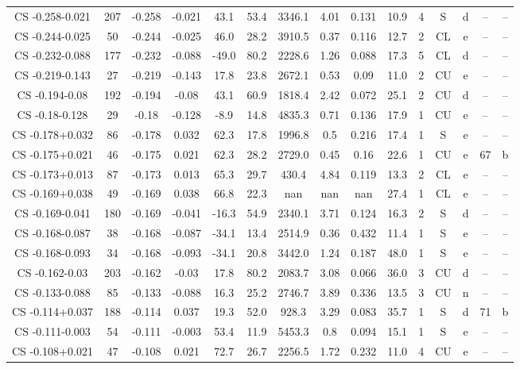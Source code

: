 \begin{table}
\begin{tabular}{ccccccccccccccc}
CS -0.258-0.021 & 207 & -0.258 & -0.021 & 43.1 & 53.4 & 3346.1 & 4.01 & 0.131 & 10.9 & 4 & S & d & -- & -- \\
CS -0.244-0.025 & 50 & -0.244 & -0.025 & 46.0 & 28.2 & 3910.5 & 0.37 & 0.116 & 12.7 & 2 & CL & e & -- & -- \\
CS -0.232-0.088 & 177 & -0.232 & -0.088 & -49.0 & 80.2 & 2228.6 & 1.26 & 0.088 & 17.3 & 5 & CL & d & -- & -- \\
CS -0.219-0.143 & 27 & -0.219 & -0.143 & 17.8 & 23.8 & 2672.1 & 0.53 & 0.09 & 11.0 & 2 & CU & e & -- & -- \\
CS -0.194-0.08 & 192 & -0.194 & -0.08 & 43.1 & 60.9 & 1818.4 & 2.42 & 0.072 & 25.1 & 2 & CU & d & -- & -- \\
CS -0.18-0.128 & 29 & -0.18 & -0.128 & -8.9 & 14.8 & 4835.3 & 0.71 & 0.136 & 17.9 & 1 & CU & e & -- & -- \\
CS -0.178+0.032 & 86 & -0.178 & 0.032 & 62.3 & 17.8 & 1996.8 & 0.5 & 0.216 & 17.4 & 1 & S & e & -- & -- \\
CS -0.175+0.021 & 46 & -0.175 & 0.021 & 62.3 & 28.2 & 2729.0 & 0.45 & 0.16 & 22.6 & 1 & CU & e & 67 & b \\
CS -0.173+0.013 & 87 & -0.173 & 0.013 & 65.3 & 29.7 & 430.4 & 4.84 & 0.119 & 13.3 & 2 & CL & e & -- & -- \\
CS -0.169+0.038 & 49 & -0.169 & 0.038 & 66.8 & 22.3 & nan & nan & nan & 27.4 & 1 & CL & e & -- & -- \\
CS -0.169-0.041 & 180 & -0.169 & -0.041 & -16.3 & 54.9 & 2340.1 & 3.71 & 0.124 & 16.3 & 2 & S & d & -- & -- \\
CS -0.168-0.087 & 38 & -0.168 & -0.087 & -34.1 & 13.4 & 2514.9 & 0.36 & 0.432 & 11.4 & 1 & S & e & -- & -- \\
CS -0.168-0.093 & 34 & -0.168 & -0.093 & -34.1 & 20.8 & 3442.0 & 1.24 & 0.187 & 48.0 & 1 & S & e & -- & -- \\
CS -0.162-0.03 & 203 & -0.162 & -0.03 & 17.8 & 80.2 & 2083.7 & 3.08 & 0.066 & 36.0 & 3 & CU & d & -- & -- \\
CS -0.133-0.088 & 85 & -0.133 & -0.088 & 16.3 & 25.2 & 2746.7 & 3.89 & 0.336 & 13.5 & 3 & CU & n & -- & -- \\
CS -0.114+0.037 & 188 & -0.114 & 0.037 & 19.3 & 52.0 & 928.3 & 3.29 & 0.083 & 35.7 & 1 & S & d & 71 & b \\
CS -0.111-0.003 & 54 & -0.111 & -0.003 & 53.4 & 11.9 & 5453.3 & 0.8 & 0.094 & 15.1 & 1 & S & e & -- & -- \\
CS -0.108+0.021 & 47 & -0.108 & 0.021 & 72.7 & 26.7 & 2256.5 & 1.72 & 0.232 & 11.0 & 4 & CU & e & -- & -- \\

\end{tabular}
\end{table}
